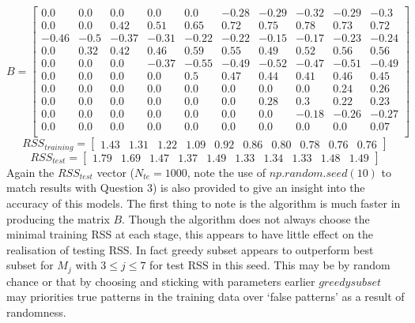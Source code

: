 \documentclass{article}
\begin{document}
\begin{equation*}
B= 
\begin{bmatrix}
0.0 & 0.0 & 0.0 & 0.0 & 0.0 & -0.28 & -0.29 & -0.32 & -0.29 & -0.3 \\
0.0 & 0.0 & 0.42 & 0.51 & 0.65 & 0.72 & 0.75 & 0.78 & 0.73 & 0.72 \\ 
-0.46 & -0.5 & -0.37 & -0.31 & -0.22 & -0.22 & -0.15 & -0.17 & -0.23 & -0.24 \\
0.0 & 0.32 & 0.42 & 0.46 & 0.59 & 0.55 & 0.49 & 0.52 & 0.56 & 0.56 \\
0.0 & 0.0 & 0.0 & -0.37 & -0.55 & -0.49 & -0.52 & -0.47 & -0.51 & -0.49 \\ 
0.0 & 0.0 & 0.0 & 0.0 & 0.5 & 0.47 & 0.44 & 0.41 & 0.46 & 0.45 \\
0.0 & 0.0 & 0.0 & 0.0 & 0.0 & 0.0 & 0.0 & 0.0 & 0.24 & 0.26 \\
0.0 & 0.0 & 0.0 & 0.0 & 0.0 & 0.0 & 0.28 & 0.3 & 0.22 & 0.23 \\ 
0.0 & 0.0 & 0.0 & 0.0 & 0.0 & 0.0 & 0.0 & -0.18 & -0.26 & -0.27 \\ 
0.0 & 0.0 & 0.0 & 0.0 & 0.0 & 0.0 & 0.0 & 0.0 & 0.0 & 0.07 \\
\end{bmatrix} 
\end{equation*}
\begin{equation*}
RSS_{training} = 
\begin{bmatrix}
1.43 & 1.31 & 1.22 & 1.09 & 0.92 & 0.86 & 0.80 & 0.78 & 0.76 &  0.76
\end{bmatrix} 
\end{equation*}
\begin{equation*}
RSS_{test} = 
\begin{bmatrix}
1.79 & 1.69 & 1.47 & 1.37 & 1.49 & 1.33 & 1.34 & 1.33 & 1.48 & 1.49
\end{bmatrix} 
\end{equation*}
Again the $RSS_{test}$ vector ($N_{te}=1000$, note the use of $np.random.seed(10)$ to match results with Question 3) is also provided to give an insight into the accuracy of this models. The first thing to note is the algorithm is much faster in producing the matrix $B$. Though the algorithm does not always choose the minimal training RSS at each stage, this appears to have little effect on the realisation of testing RSS. In fact greedy subset appears to outperform best subset for $M_j$ with $3 \leq j \leq 7$ for test RSS in this seed. This may be by random chance or that by choosing and sticking with parameters earlier $greedysubset$ may priorities true patterns in the training data over `false patterns' as a result of randomness.
\end{document}
